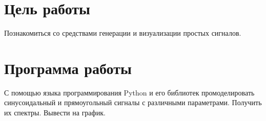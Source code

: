 
\usepackage{minted}







\section{Цель работы}
Познакомиться со средствами генерации и визуализации простых сигналов.

\section{Программа работы}
С помощью языка программирования Python и его библиотек
промоделировать синусоидальный и прямоугольный сигналы с различными параметрами. Получить их спектры. Вывести на график.

